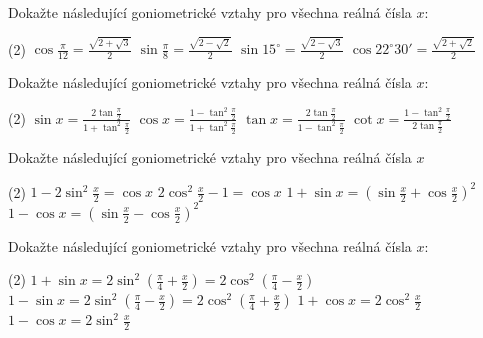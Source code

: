 \documentclass[12pt,a4paper]{article}
\begin{document}
\exercisepart
\setcounter{section}{1}
\begin{exercise}[Dokažte I.]
    Dokažte následující goniometrické vztahy pro všechna reálná čísla $x$:
    \begin{tasks}(2)
        \task $\cos \frac{\pi}{12} = \frac{\sqrt{2 + \sqrt{3}}}{2}$
        \task $\sin \frac{\pi}{8} = \frac{\sqrt{2 - \sqrt{2}}}{2}$
        \task $\sin 15^\circ = \frac{\sqrt{2 - \sqrt{3}}}{2}$
        \task $\cos 22^\circ 30' = \frac{\sqrt{2 + \sqrt{2}}}{2}$
    \end{tasks}
\end{exercise}


\begin{exercise}[Dokažte II.]
    Dokažte následující goniometrické vztahy pro všechna reálná čísla $x$:
    \begin{tasks}(2)
        \task $\sin x = \frac{2 \tan \frac{\pi}{2}}{1 + \tan^2 \frac{\pi}{2}}$
        \task $\cos x = \frac{1 - \tan^2 \frac{\pi}{2}}{1 + \tan^2 \frac{\pi}{2}}$
        \task $\tan x = \frac{2 \tan \frac{\pi}{2}}{1 - \tan^2 \frac{\pi}{2}}$
        \task $\cot x = \frac{1 - \tan^2 \frac{\pi}{2}}{2 \tan \frac{\pi}{2}}$
    \end{tasks}
\end{exercise}


\begin{exercise}
    Dokažte následující goniometrické vztahy pro všechna reálná čísla $x$
    \begin{tasks}(2)
        \task $1 - 2 \sin^2 \frac{x}{2} = \cos x$
        \task $2 \cos^2 \frac{x}{2} - 1 = \cos x$
        \task $1 + \sin x = \left(\sin \frac{x}{2} + \cos \frac{x}{2}\right)^2$
        \task $1 - \cos x = \left(\sin \frac{x}{2} - \cos \frac{x}{2}\right)^2$
    \end{tasks}
\end{exercise}


\begin{exercise}[Dokažte IV.]
    Dokažte následující goniometrické vztahy pro všechna reálná čísla $x$:
    \begin{tasks}(2)
        \task $1 + \sin x = 2 \sin^2 \left(\frac{\pi}{4} + \frac{x}{2}\right) = 2 \cos^2 \left(\frac{\pi}{4} - \frac{x}{2}\right)$
        \task $1 - \sin x = 2 \sin^2 \left(\frac{\pi}{4} - \frac{x}{2}\right) = 2 \cos^2 \left(\frac{\pi}{4} + \frac{x}{2}\right)$
        \task $1 + \cos x = 2 \cos^2 \frac{x}{2}$
        \task $1 - \cos x = 2 \sin^2 \frac{x}{2}$
    \end{tasks}
\end{exercise}
\end{document}
